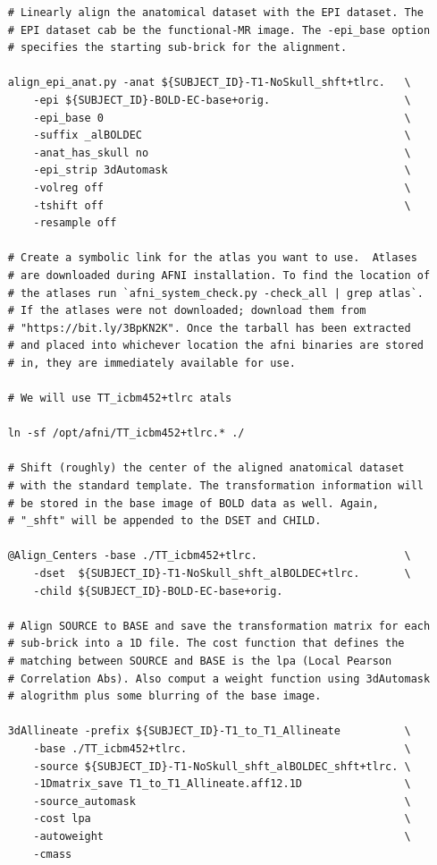\documentclass[12pt]{article}
\begin{document}
\begin{verbatim}
    # Linearly align the anatomical dataset with the EPI dataset. The
    # EPI dataset cab be the functional-MR image. The -epi_base option
    # specifies the starting sub-brick for the alignment.

    align_epi_anat.py -anat ${SUBJECT_ID}-T1-NoSkull_shft+tlrc.   \
        -epi ${SUBJECT_ID}-BOLD-EC-base+orig.                     \
        -epi_base 0                                               \
        -suffix _alBOLDEC                                         \
        -anat_has_skull no                                        \
        -epi_strip 3dAutomask                                     \
        -volreg off                                               \
        -tshift off                                               \
        -resample off

    # Create a symbolic link for the atlas you want to use.  Atlases
    # are downloaded during AFNI installation. To find the location of
    # the atlases run `afni_system_check.py -check_all | grep atlas`.
    # If the atlases were not downloaded; download them from
    # "https://bit.ly/3BpKN2K". Once the tarball has been extracted
    # and placed into whichever location the afni binaries are stored
    # in, they are immediately available for use.

    # We will use TT_icbm452+tlrc atals

    ln -sf /opt/afni/TT_icbm452+tlrc.* ./

    # Shift (roughly) the center of the aligned anatomical dataset
    # with the standard template. The transformation information will
    # be stored in the base image of BOLD data as well. Again,
    # "_shft" will be appended to the DSET and CHILD.

    @Align_Centers -base ./TT_icbm452+tlrc.                       \
        -dset  ${SUBJECT_ID}-T1-NoSkull_shft_alBOLDEC+tlrc.       \
        -child ${SUBJECT_ID}-BOLD-EC-base+orig.

    # Align SOURCE to BASE and save the transformation matrix for each
    # sub-brick into a 1D file. The cost function that defines the
    # matching between SOURCE and BASE is the lpa (Local Pearson
    # Correlation Abs). Also comput a weight function using 3dAutomask
    # alogrithm plus some blurring of the base image.

    3dAllineate -prefix ${SUBJECT_ID}-T1_to_T1_Allineate          \
        -base ./TT_icbm452+tlrc.                                  \
        -source ${SUBJECT_ID}-T1-NoSkull_shft_alBOLDEC_shft+tlrc. \
        -1Dmatrix_save T1_to_T1_Allineate.aff12.1D                \
        -source_automask                                          \
        -cost lpa                                                 \
        -autoweight                                               \
        -cmass


\end{verbatim}
\end{document}
